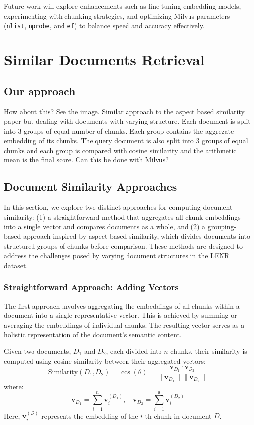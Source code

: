 \documentclass[12pt]{article}
\begin{document}
    Future work will explore enhancements such as fine-tuning embedding models, experimenting with chunking strategies, and optimizing Milvus parameters (\texttt{nlist}, \texttt{nprobe}, and \texttt{ef}) to balance speed and accuracy effectively.
    
\section{Similar Documents Retrieval}
    \subsection{Our approach}

    {How about this? See the image. Similar approach to the aspect based similarity paper but dealing with documents with varying structure. Each document is split into 3 groups of equal number of chunks. Each group contains the aggregate embedding of its chunks. The query document is also split into 3 groups of equal chunks and each group is compared with cosine similarity and the arithmetic mean is the final score. Can this be done with Milvus?}

    \subsection{Document Similarity Approaches}

In this section, we explore two distinct approaches for computing document similarity: (1) a straightforward method that aggregates all chunk embeddings into a single vector and compares documents as a whole, and (2) a grouping-based approach inspired by aspect-based similarity, which divides documents into structured groups of chunks before comparison. These methods are designed to address the challenges posed by varying document structures in the LENR dataset.

\subsubsection{Straightforward Approach: Adding Vectors}

The first approach involves aggregating the embeddings of all chunks within a document into a single representative vector. This is achieved by summing or averaging the embeddings of individual chunks. The resulting vector serves as a holistic representation of the document's semantic content.

Given two documents, \(D_1\) and \(D_2\), each divided into \(n\) chunks, their similarity is computed using cosine similarity between their aggregated vectors:
\[
\text{Similarity}(D_1, D_2) = \cos(\theta) = \frac{\mathbf{v}_{D_1} \cdot \mathbf{v}_{D_2}}{\|\mathbf{v}_{D_1}\| \|\mathbf{v}_{D_2}\|}
\]
where:
\[
\mathbf{v}_{D_1} = \sum_{i=1}^{n} \mathbf{v}_{i}^{(D_1)}, \quad \mathbf{v}_{D_2} = \sum_{i=1}^{n} \mathbf{v}_{i}^{(D_2)}
\]
Here, \(\mathbf{v}_i^{(D)}\) represents the embedding of the \(i\)-th chunk in document \(D\).
\end{document}
